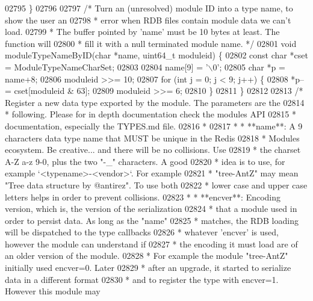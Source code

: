 \begin{DoxyCode}
{{{02795 \}
02796 
02797 \textcolor{comment}{/* Turn an (unresolved) module ID into a type name, to show the user an}
02798 \textcolor{comment}{ * error when RDB files contain module data we can't load.}
02799 \textcolor{comment}{ * The buffer pointed by 'name' must be 10 bytes at least. The function will}
02800 \textcolor{comment}{ * fill it with a null terminated module name. */}
02801 \textcolor{keywordtype}{void} moduleTypeNameByID(\textcolor{keywordtype}{char} *name, uint64\_t moduleid) \{
02802     \textcolor{keyword}{const} \textcolor{keywordtype}{char} *cset = ModuleTypeNameCharSet;
02803 
02804     name[9] = \textcolor{stringliteral}{'\(\backslash\)0'};
02805     \textcolor{keywordtype}{char} *p = name+8;
02806     moduleid >>= 10;
02807     \textcolor{keywordflow}{for} (\textcolor{keywordtype}{int} j = 0; j < 9; j++) \{
02808         *p-- = cset[moduleid & 63];
02809         moduleid >>= 6;
02810     \}
02811 \}
02812 
02813 \textcolor{comment}{/* Register a new data type exported by the module. The parameters are the}
02814 \textcolor{comment}{ * following. Please for in depth documentation check the modules API}
02815 \textcolor{comment}{ * documentation, especially the TYPES.md file.}
02816 \textcolor{comment}{ *}
02817 \textcolor{comment}{ * * **name**: A 9 characters data type name that MUST be unique in the Redis}
02818 \textcolor{comment}{ *   Modules ecosystem. Be creative... and there will be no collisions. Use}
02819 \textcolor{comment}{ *   the charset A-Z a-z 9-0, plus the two "-\_" characters. A good}
02820 \textcolor{comment}{ *   idea is to use, for example `<typename>-<vendor>`. For example}
02821 \textcolor{comment}{ *   "tree-AntZ" may mean "Tree data structure by @antirez". To use both}
02822 \textcolor{comment}{ *   lower case and upper case letters helps in order to prevent collisions.}
02823 \textcolor{comment}{ * * **encver**: Encoding version, which is, the version of the serialization}
02824 \textcolor{comment}{ *   that a module used in order to persist data. As long as the "name"}
02825 \textcolor{comment}{ *   matches, the RDB loading will be dispatched to the type callbacks}
02826 \textcolor{comment}{ *   whatever 'encver' is used, however the module can understand if}
02827 \textcolor{comment}{ *   the encoding it must load are of an older version of the module.}
02828 \textcolor{comment}{ *   For example the module "tree-AntZ" initially used encver=0. Later}
02829 \textcolor{comment}{ *   after an upgrade, it started to serialize data in a different format}
02830 \textcolor{comment}{ *   and to register the type with encver=1. However this module may}
}}}
\end{DoxyCode}
